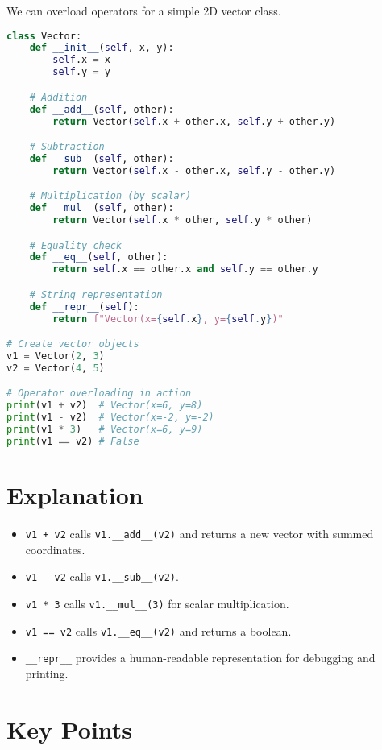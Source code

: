 We can overload operators for a simple 2D vector class.

\begin{lstlisting}[language=Python, caption=Vector Class with Operator Overloading]
class Vector:
    def __init__(self, x, y):
        self.x = x
        self.y = y

    # Addition
    def __add__(self, other):
        return Vector(self.x + other.x, self.y + other.y)

    # Subtraction
    def __sub__(self, other):
        return Vector(self.x - other.x, self.y - other.y)

    # Multiplication (by scalar)
    def __mul__(self, other):
        return Vector(self.x * other, self.y * other)

    # Equality check
    def __eq__(self, other):
        return self.x == other.x and self.y == other.y

    # String representation
    def __repr__(self):
        return f"Vector(x={self.x}, y={self.y})"

# Create vector objects
v1 = Vector(2, 3)
v2 = Vector(4, 5)

# Operator overloading in action
print(v1 + v2)  # Vector(x=6, y=8)
print(v1 - v2)  # Vector(x=-2, y=-2)
print(v1 * 3)   # Vector(x=6, y=9)
print(v1 == v2) # False
\end{lstlisting}

\section{Explanation}

\begin{itemize}
    \item \texttt{v1 + v2} calls \texttt{v1.\_\_add\_\_(v2)} and returns a new vector with summed coordinates.
    \item \texttt{v1 - v2} calls \texttt{v1.\_\_sub\_\_(v2)}.
    \item \texttt{v1 * 3} calls \texttt{v1.\_\_mul\_\_(3)} for scalar multiplication.
    \item \texttt{v1 == v2} calls \texttt{v1.\_\_eq\_\_(v2)} and returns a boolean.
    \item \texttt{\_\_repr\_\_} provides a human-readable representation for debugging and printing.
\end{itemize}

\section{Key Points}

